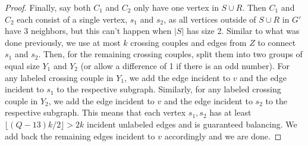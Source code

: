 \documentclass{article}
\newtheorem{lemma}{Lemma}[section]
\begin{document}
\begin{proof}
    Finally, say both $C_1$ and $C_2$ only have one vertex in $S \cup R$. Then $C_1$ and $C_2$ each consist of a single vertex, $s_1$ and $s_2$, as all vertices outside of $S \cup R$ in $G'$ have 3 neighbors, but this can't happen when $|S|$ has size 2. Similar to what was done previously, we use at most $k$ crossing couples and edges from $Z$ to connect $s_1$ and $s_2$. Then, for the remaining crossing couples, split them into two groups of equal size $Y_1$ and $Y_2$ (or allow a difference of 1 if there is an odd number). For any labeled crossing couple in $Y_1$, we add the edge incident to $v$ and the edge incident to $s_1$ to the respective subgraph. Similarly, for any labeled crossing couple in $Y_2$, we add the edge incident to $v$ and the edge incident to $s_2$ to the respective subgraph. This means that each vertex $s_1,s_2$ has at least $\lfloor (Q-13)k/2 \rfloor > 2k$ incident unlabeled edges and is guaranteed balancing. We add back the remaining edges incident to $v$ accordingly and we are done. 
\end{proof}



\end{document}
